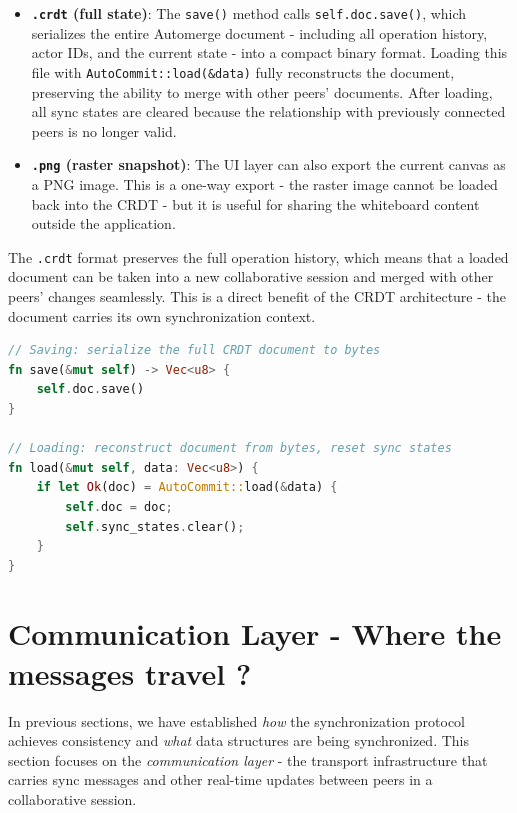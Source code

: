 \documentclass[a4paper,11pt,twoside]{report}
\theoremstyle{definition}
\begin{document}
\begin{itemize}
    \item \textbf{\texttt{.crdt} (full state)}: The \texttt{save()} method calls 
    \texttt{self.doc.save()}, which serializes the entire Automerge document - including all 
    operation history, actor IDs, and the current state - into a compact binary format. 
    Loading this file with \texttt{AutoCommit::load(\&data)} fully reconstructs the document, 
    preserving the ability to merge with other peers' documents. After loading, all sync states 
    are cleared because the relationship with previously connected peers is no longer valid.
    
    \item \textbf{\texttt{.png} (raster snapshot)}: The UI layer can also export the current 
    canvas as a PNG image. This is a one-way export - the raster image cannot be loaded back 
    into the CRDT - but it is useful for sharing the whiteboard content outside the 
    application.
    
\end{itemize}

The \texttt{.crdt} format preserves the full operation history, which means that a loaded 
document can be taken into a new collaborative session and merged with other peers' changes 
seamlessly. This is a direct benefit of the CRDT architecture - the document carries its 
own synchronization context.

\begin{lstlisting}[language=Rust]
// Saving: serialize the full CRDT document to bytes
fn save(&mut self) -> Vec<u8> {
    self.doc.save()
}

// Loading: reconstruct document from bytes, reset sync states
fn load(&mut self, data: Vec<u8>) {
    if let Ok(doc) = AutoCommit::load(&data) {
        self.doc = doc;
        self.sync_states.clear();
    }
}
\end{lstlisting}




\section{Communication Layer - Where the messages travel ?}

In previous sections, we have established \emph{how} the synchronization protocol achieves consistency and \emph{what} 
data structures are being synchronized. This section focuses on the \emph{communication layer} - the transport
 infrastructure that carries sync messages and other real-time updates between peers in a collaborative session.
\end{document}
